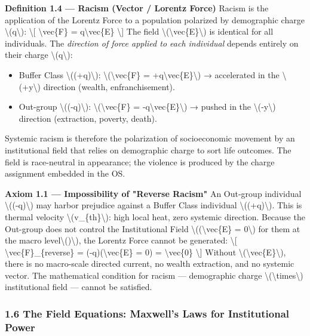 \textbf{Definition 1.4 --- Racism (Vector / Lorentz Force)} Racism is
the application of the Lorentz Force to a population polarized by
demographic charge \textbackslash(q\textbackslash): \textbackslash{[}
\textbackslash vec\{F\} = q\textbackslash vec\{E\} \textbackslash{]} The
field \textbackslash(\textbackslash vec\{E\}\textbackslash) is identical
for all individuals. The \emph{direction of force applied to each
individual} depends entirely on their charge
\textbackslash(q\textbackslash):

\begin{itemize}
\tightlist
\item
  Buffer Class \textbackslash((+q)\textbackslash):
  \textbackslash(\textbackslash vec\{F\} =
  +q\textbackslash vec\{E\}\textbackslash) → accelerated in the
  \textbackslash(+y\textbackslash) direction (wealth, enfranchisement).
\item
  Out-group \textbackslash((-q)\textbackslash):
  \textbackslash(\textbackslash vec\{F\} =
  -q\textbackslash vec\{E\}\textbackslash) → pushed in the
  \textbackslash(-y\textbackslash) direction (extraction, poverty,
  death).
\end{itemize}

Systemic racism is therefore the polarization of socioeconomic movement
by an institutional field that relies on demographic charge to sort life
outcomes. The field is race-neutral in appearance; the violence is
produced by the charge assignment embedded in the OS.

\textbf{Axiom 1.1 --- Impossibility of "Reverse Racism"} An Out-group
individual \textbackslash((-q)\textbackslash) may harbor prejudice
against a Buffer Class individual \textbackslash((+q)\textbackslash).
This is thermal velocity \textbackslash(v\_\{th\}\textbackslash): high
local heat, zero systemic direction. Because the Out-group does not
control the Institutional Field \textbackslash((\textbackslash vec\{E\}
= 0\textbackslash) for them at the macro
level\textbackslash()\textbackslash), the Lorentz Force cannot be
generated: \textbackslash{[} \textbackslash vec\{F\}\_\{reverse\} =
(-q)(\textbackslash vec\{E\} = 0) = \textbackslash vec\{0\}
\textbackslash{]} Without
\textbackslash(\textbackslash vec\{E\}\textbackslash), there is no
macro-scale directed current, no wealth extraction, and no systemic
vector. The mathematical condition for racism --- demographic charge
\textbackslash(\textbackslash times\textbackslash) institutional field
--- cannot be satisfied.

\protect{}
\subsubsection{1.6 The Field Equations: Maxwell's Laws for Institutional Power}\label{the-field-equations-maxwells-laws-for-institutional-power}

